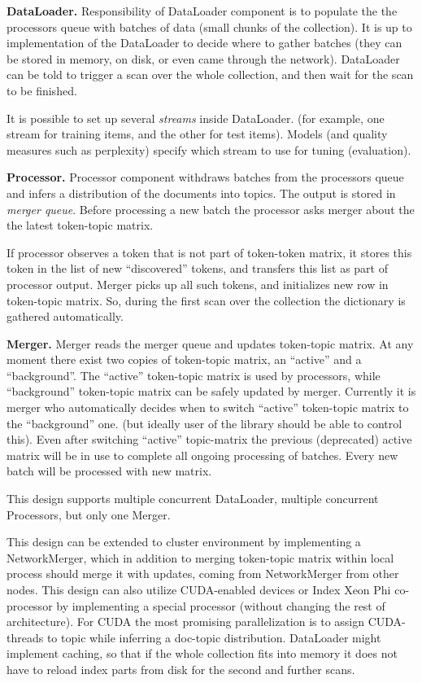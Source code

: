 \documentclass[11pt,a4paper,twoside]{report}
\begin{document}
\textbf{DataLoader.} Responsibility of DataLoader component is to populate the the processors queue
with batches of data (small chunks of the collection).
It is up to implementation of the DataLoader to decide where to gather batches
(they can be stored in memory, on disk, or even came through the network).
DataLoader can be told to trigger a scan over the whole collection,
and then wait for the scan to be finished.

It is possible to set up several \emph{streams} inside DataLoader.
(for example, one stream for training items, and the other for test items).
Models (and quality measures such as perplexity) specify which stream to use for tuning (evaluation).

\textbf{Processor.} Processor component withdraws batches from the processors queue
and infers a distribution of the documents into topics.
The output is stored in \emph{merger queue}.
Before processing a new batch the processor asks merger about the the latest token-topic matrix.

If processor observes a token that is not part of token-token matrix, it stores this token in the list of
new ``discovered'' tokens, and transfers this list as part of processor output.
Merger picks up all such tokens, and initializes new row in token-topic matrix.
So, during the first scan over the collection the dictionary is gathered automatically.

\textbf{Merger.}
Merger reads the merger queue and updates token-topic matrix.
At any moment there exist two copies of token-topic matrix,
an ``active'' and a ``background''.
The ``active'' token-topic matrix is used by processors,
while ``background'' token-topic matrix can be safely updated by merger.
Currently it is merger who automatically decides when to switch ``active''
token-topic matrix to the ``background'' one.
(but ideally user of the library should be able to control this).
Even after switching ``active'' topic-matrix the previous (deprecated) active matrix
will be in use to complete all ongoing processing of batches.
Every new batch will be processed with new matrix.

This design supports multiple concurrent DataLoader, multiple concurrent Processors, but only one Merger.

This design can be extended to cluster environment by implementing a NetworkMerger,
which in addition to merging token-topic matrix within local process should merge it with updates,
coming from NetworkMerger from other nodes.
This design can also utilize CUDA-enabled devices or Index Xeon Phi co-processor
by implementing a special processor (without changing the rest of architecture).
For CUDA the most promising parallelization is to assign CUDA-threads to topic
while inferring a doc-topic distribution.
DataLoader might implement caching, so that if the whole collection fits into memory
it does not have to reload index parts from disk for the second and further scans.
\end{document}
